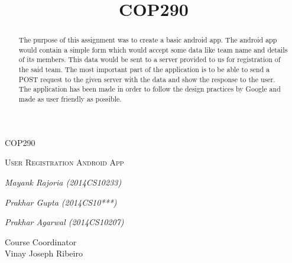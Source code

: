 \documentclass[12pt]{article}
\begin{document}
\begin{titlepage}
\title{COP290}
\centering
{\scshape\Large COP290\par}
\vspace{1cm}
{\scshape\Huge User Registration Android App\par}

\vspace{3cm}
	{\Large\itshape Mayank Rajoria (2014CS10233)\par}
\vspace{0.3cm}
	{\Large\itshape Prakhar Gupta (2014CS10***)\par}
\vspace{0.3cm}
	{\Large\itshape Prakhar Agarwal (2014CS10207)\par}

\vfill
\raggedleft
Course  Coordinator\\
Vinay Joseph Ribeiro
\end{titlepage}

\begin{abstract}
The purpose of this assignment was to create a basic android app. The android app would contain a simple form which would accept some data like team name and details of its members. This data would be sent to a server provided to us for registration of the said team. The most important part of the application is to be able to send a POST request to the given server with the data and show the response to the user. The application has been made in order to follow the design practices by Google and made as user friendly as possible.
\end{abstract}


\end{document}
